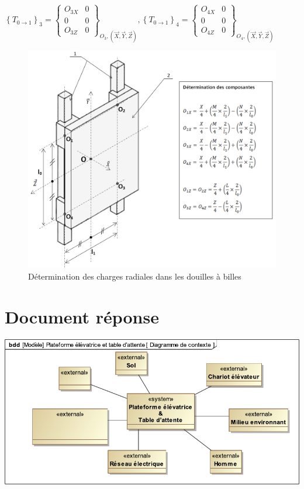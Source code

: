 \begin{center}
$\left\{T_{0\rightarrow 1}\right\}_3=\left\{\begin{array}{cc}O_{3X} & 0 \\ 0 & 0 \\ O_{3Z} & 0\end{array}\right\}_{O_3,(\overrightarrow{X},\overrightarrow{Y},\overrightarrow{Z})},\left\{T_{0\rightarrow 1}\right\}_4=\left\{\begin{array}{cc}O_{4X} & 0 \\ 0 & 0 \\ O_{4Z} & 0\end{array}\right\}_{O_4,(\overrightarrow{X},\overrightarrow{Y},\overrightarrow{Z})}$
\end{center}


\begin{figure}[!h]
\centering
\includegraphics[width=0.6\linewidth]{img/fig11}
\caption{Détermination des charges radiales dans les douilles à billes}
\label{fig11}
\end{figure}

\cleardoublepage

\section{Document réponse}



\begin{center}
\includegraphics[width=0.95\linewidth]{img/Diagramme_de_contexte_vide}
\end{center}

